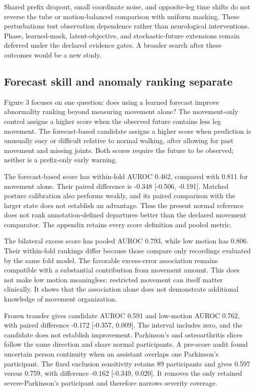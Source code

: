 \documentclass[letterpaper]{article}
\begin{document}
Shared prefix dropout, small coordinate noise, and opposite-leg time shifts do not reverse the tube or motion-balanced comparison with uniform masking. These perturbations test observation dependence rather than neurological interventions. Phase, learned-mask, latent-objective, and stochastic-future extensions remain deferred under the declared evidence gates. A broader search after these outcomes would be a new study.

\subsection{Forecast skill and anomaly ranking separate}

Figure 3 focuses on one question: does using a learned forecast improve abnormality ranking beyond measuring movement alone? The movement-only control assigns a higher score when the observed future contains less leg movement. The forecast-based candidate assigns a higher score when prediction is unusually easy or difficult relative to normal walking, after allowing for past movement and missing joints. Both scores require the future to be observed; neither is a prefix-only early warning.

The forecast-based score has within-fold AUROC 0.462, compared with 0.811 for movement alone. Their paired difference is -0.348 [-0.506, -0.191]. Matched posture calibration also performs weakly, and its paired comparison with the larger state does not establish an advantage. Thus the present normal reference does not rank annotation-defined departures better than the declared movement comparator. The appendix retains every score definition and pooled metric.

The bilateral excess score has pooled AUROC 0.793, while low motion has 0.806. Their within-fold rankings differ because those compare only recordings evaluated by the same fold model. The favorable excess-error association remains compatible with a substantial contribution from movement amount. This does not make low motion meaningless: restricted movement can itself matter clinically. It shows that the association alone does not demonstrate additional knowledge of movement organization.

Frozen transfer gives candidate AUROC 0.591 and low-motion AUROC 0.762, with paired difference -0.172 [-0.357, 0.009]. The interval includes zero, and the candidate does not establish improvement. Parkinson's and osteoarthritis slices follow the same direction and share normal participants. A pre-score audit found uncertain person continuity when an assistant overlaps one Parkinson's participant. The fixed exclusion sensitivity retains 89 participants and gives 0.597 versus 0.759, with difference -0.162 [-0.349, 0.020]. It removes the only retained severe-Parkinson's participant and therefore narrows severity coverage.
\end{document}
